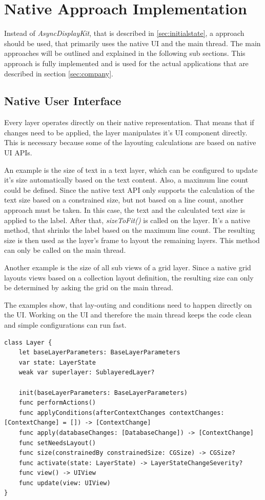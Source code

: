 \section{Native Approach Implementation}
\label{sec:nativeapproachimplementation}

Instead of \textit{AsyncDisplayKit}, that is described in \ref{sec:initialstate}, a approach should be used, that primarily uses the native \ac{UI} and the main thread.
The main approaches will be outlined and explained in the following sub sections.
This approach is fully implemented and is used for the actual applications that are described in section \ref{sec:company}.

\subsection{Native User Interface}

Every layer operates directly on their native representation.
That means that if changes need to be applied, the layer manipulates it's \ac{UI} component directly.
This is necessary because some of the layouting calculations are based on native \ac{UI} \acp{API}.

An example is the size of text in a text layer, which can be configured to update it's size automatically based on the text content.
Also, a maximum line count could be defined.
Since the native text \ac{API} only supports the calculation of the text size based on a constrained size, but not based on a line count, another approach must be taken.
In this case, the text and the calculated text size is applied to the label.
After that, \textit{sizeToFit()} is called on the layer.
It's a native method, that shrinks the label based on the maximum line count.
The resulting size is then used as the layer's frame to layout the remaining layers.
This method can only be called on the main thread.

Another example is the size of all sub views of a grid layer.
Since a native grid layouts views based on a collection layout definition, the resulting size can only be determined by asking the grid on the main thread.

The examples show, that lay-outing and conditions need to happen directly on the \ac{UI}.
Working on the \ac{UI} and therefore the main thread keeps the code clean and simple configurations can run fast.

\begin{lstlisting}[style=swift, caption={Layer class (excerpt)}, label={lst:layerclass}]
class Layer {
	let baseLayerParameters: BaseLayerParameters
	var state: LayerState
	weak var superlayer: SublayeredLayer?
	
	init(baseLayerParameters: BaseLayerParameters)
	func performActions()
	func applyConditions(afterContextChanges contextChanges: [ContextChange] = []) -> [ContextChange]
	func apply(databaseChanges: [DatabaseChange]) -> [ContextChange]
	func setNeedsLayout()
	func size(constrainedBy constrainedSize: CGSize) -> CGSize?
	func activate(state: LayerState) -> LayerStateChangeSeverity?
	func view() -> UIView
	func update(view: UIView)
}
\end{lstlisting}

